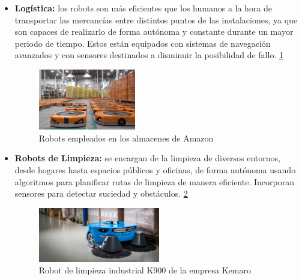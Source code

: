 \begin{itemize}

    \item \textbf{Logística:} los robots son más eficientes que los humanos a la hora de transportar las mercancías entre distintos puntos de las instalaciones, ya que son capaces de realizarlo de forma autónoma y constante durante un mayor periodo de tiempo. Estos están equipados con sistemas de navegación avanzados y con sensores destinados a disminuir la posibilidad de fallo. \ref{fig:almacenes}
    \begin{figure}[H]
        \centering
        \includegraphics[width=0.4\textwidth]{figures/intro/amazon.png}
        \caption{Robots empleados en los almacenes de Amazon}
        \label{fig:almacenes}
    \end{figure}

    \item \textbf{Robots de Limpieza:} se encargan de la limpieza de diversos entornos, desde hogares hasta espacios públicos y oficinas, de forma autónoma usando algoritmos para planificar rutas de limpieza de manera eficiente. Incorporan sensores para detectar suciedad y obstáculos. \ref{fig:roomba}
    \begin{figure}[H]
        \centering
        \includegraphics[width=0.5\textwidth]{figures/intro/vacuum.jpeg}
        \caption{Robot de limpieza industrial K900 de la empresa Kemaro}
        \label{fig:roomba}
    \end{figure}
    
\end{itemize}


